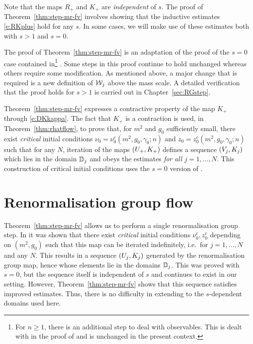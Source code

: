Note that the maps $R_+$ and $K_+$ are \emph{independent} of $s$.
The proof of Theorem~\ref{thm:step-mr-fv} involves showing that the
inductive estimates \eqref{e:RKplus} hold for any $s$. In some cases,
we will make use of these estimates both with $s > 1$ and $s = 0$.

The proof of Theorem~\ref{thm:step-mr-fv} is an adaptation of the proof
of the $s = 0$ case contained
in\footnote{For $n \ge 1$, there is an additional step to deal with observables.
This is dealt with in the proof of \cite[Theorem~\ref{phi4-thm:step-mr-fv}]{ST-phi4}
and is unchanged in the present context.}
\cite{BS-rg-IE,BS-rg-step}.
Some steps in this proof continue to hold unchanged whereas others require
some modification. As mentioned above, a major change that is required is
a new definition of $\mathcal{W}_j$ above the mass scale. A detailed verification
that the proof holds for $s > 1$ is carried out in Chapter~\ref{sec:RGstep}.

Theorem~\ref{thm:step-mr-fv} expresses a contractive property of the map $K_+$
through \eqref{e:DKkappa}.
The fact that $K_+$ is a contraction is used, in Theorem~\ref{thm:rhatflow},
to prove that, for $m^2$ and $g_0$ sufficiently small, there exist
\emph{critical} initial conditions
$\nu_0 = \nu_0^c(m^2, g_0, \gamma_0; n)$ and $z_0 = z_0^c(m^2, g_0,\gamma_0; n)$
such that for any $N$,
iteration of the maps $(U_+,K_+)$ defines a sequence $(V_j, K_j)$
which lies in the domain $\mathbb{D}_j$ and obeys the estimates 
\emph{for all} $j = 1, \ldots, N$.
This construction of critical initial conditions uses the $s=0$ version
of .


\section{Renormalisation group flow}

Theorem~\ref{thm:step-mr-fv} allows us to perform a single renormalisation group
step. In \cite[Proposition~\ref{log-prop:flow-flow}]{BBS-saw4-log} it was shown
that there exist \emph{critical} initial conditions
$\nu_0^c, z_0^c$ depending on $(m^2, g_0)$ such that this map can be iterated
indefinitely, i.e.\ for $j = 1, \ldots, N$ and any $N$. This results in a
sequence $(U_j, K_j)$ generated by the renormalisation group map, hence
whose elements lie in the domains $\mathbb{D}_j$. This was proved with $s = 0$,
but the sequence itself is independent of $s$ and continues to exist in our
setting. However, Theorem~\ref{thm:step-mr-fv} shows that this sequence satisfies
improved estimates. Thus, there is no difficulty in extending
\cite[Proposition~\ref{log-prop:flow-flow}]{BBS-saw4-log} to the $s$-dependent
domains used here.

